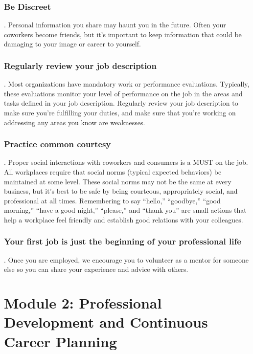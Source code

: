 \subsubsection*{Be Discreet}. Personal information you share may haunt you in the future. Often your coworkers become friends, but it's important to keep information that could be damaging to your image or career to yourself.

\subsubsection*{Regularly review your job description}. Most organizations have mandatory work or performance evaluations. Typically, these evaluations monitor your level of performance on the job in the areas and tasks defined in your job description. Regularly review your job description to make sure you're fulfilling your duties, and make sure that you're working on addressing any areas you know are weaknesses.

\subsubsection*{Practice common courtesy}. Proper social interactions with coworkers and consumers is a MUST on the job. All workplaces require that social norms (typical expected behaviors) be maintained at some level. These social norms may not be the same at every business, but it's best to be safe by being courteous, appropriately social, and professional at all times. Remembering to say ``hello,'' ``goodbye,'' ``good morning,'' ``have a good night,'' ``please,'' and ``thank you'' are small actions that help a workplace feel friendly and establish good relations with your colleagues.

\subsubsection*{Your first job is just the beginning of your professional life}. Once you are employed, we encourage you to volunteer as a mentor for someone else so you can share your experience and advice with others.


\pagebreak \section*{Module 2: Professional Development and Continuous Career Planning}
\noindent\makebox[\textwidth]{\rule{\linewidth}{0.4pt}}  \localtableofcontents
\noindent\makebox[\textwidth]{\rule{\linewidth}{0.4pt}}

